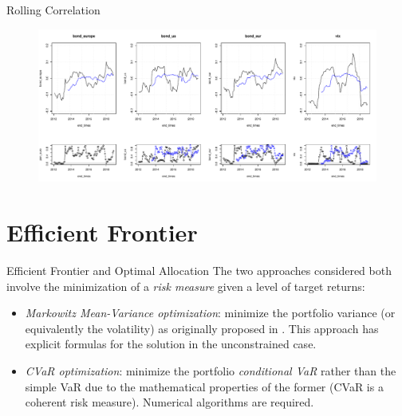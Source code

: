 \documentclass{beamer}
\begin{document}
\begin{frame}{Rolling Correlation}
\begin{figure}
\includegraphics[width=\textwidth]{rolling_bonds.pdf}
\label{roll_stocks}
\end{figure}
\end{frame}

\section{Efficient Frontier}

\begin{frame}{Efficient  Frontier and Optimal Allocation}
The two approaches considered both involve the minimization of a \textit{risk measure} given a level of target returns:
\begin{itemize}
	\item \textit{Markowitz Mean-Variance optimization}:  minimize the portfolio variance (or equivalently the volatility) as originally proposed in \cite{MARKOWITZ}. This approach has explicit formulas for the solution in the unconstrained case.
	\item \textit{CVaR optimization}: minimize the portfolio \textit{conditional VaR} rather than the simple VaR due to the mathematical properties of the former (CVaR is a coherent risk measure). Numerical algorithms are required.
\end{itemize}
\end{frame}
\end{document}
